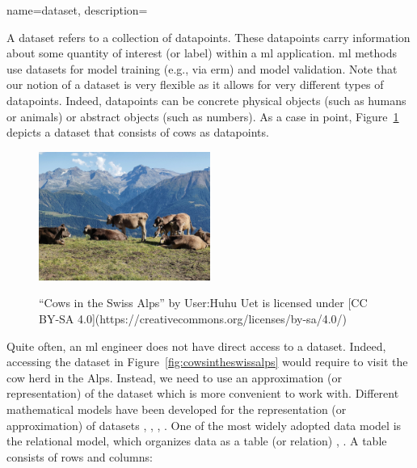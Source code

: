 {name={dataset},
	description={A dataset refers to a collection of \gls{datapoint}s. These 
		\gls{datapoint}s carry information about some quantity of interest (or \gls{label}) within 
		a \gls{ml} application. \gls{ml} methods use datasets for \gls{model} training (e.g., via \gls{erm})
		and \gls{model} \gls{validation}. Note that our notion of a dataset is very flexible as 
		it allows for very different types of \gls{datapoint}s. Indeed, \gls{datapoint}s can be concrete 
		physical objects (such as humans or animals) or abstract objects (such as numbers). 
		As a case in point, Figure\ \ref{fig_cows_dataset} depicts a dataset that consists of cows as 
		\gls{datapoint}s. 
		\begin{figure}[H]
				\begin{center}
		\label{fig:cowsintheswissalps}
		\includegraphics[width=0.5\textwidth]{assets/Cows_in_the_Swiss_Alps}
		  \end{center}
		\caption{\label{fig_cows_dataset}“Cows in the Swiss Alps” by User:Huhu Uet is licensed under [CC BY-SA 4.0](https://creativecommons.org/licenses/by-sa/4.0/)}
	  \end{figure}
       Quite often, an \gls{ml} engineer does not have direct access to a dataset. Indeed, accessing the 
       dataset in Figure\ \ref{fig:cowsintheswissalps} would require to visit the cow herd in the Alps. Instead, 
       we need to use an approximation (or representation) of the dataset which is more convenient 
       to work with. Different mathematical models have been developed for the representation (or approximation) 
       of datasets \cite{silberschatz2019database}, \cite{abiteboul1995foundations}, \cite{hoberman2009data}, \cite{ramakrishnan2002database}. 
       One of the most widely adopted data \gls{model} is the relational model, which organizes \gls{data} 
       as a table (or relation) \cite{codd1970relational}, \cite{silberschatz2019database}.
		A table consists of rows and columns:
		\begin{itemize} 

\end{itemize}}}
